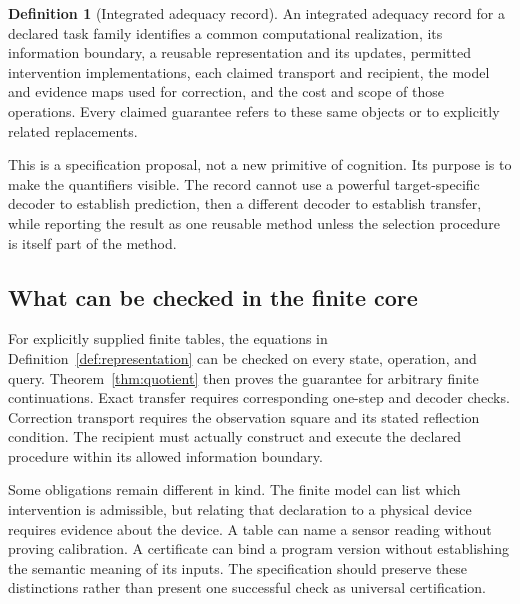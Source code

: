 \documentclass[11pt,letterpaper]{article}
\theoremstyle{plain}
\theoremstyle{definition}
\newtheorem{definition}[theorem]{Definition}
\begin{document}
\begin{definition}[Integrated adequacy record]\label{def:witness}
An integrated adequacy record for a declared task family identifies a common computational realization, its information boundary, a reusable representation and its updates, permitted intervention implementations, each claimed transport and recipient, the model and evidence maps used for correction, and the cost and scope of those operations. Every claimed guarantee refers to these same objects or to explicitly related replacements.
\end{definition}
This is a specification proposal, not a new primitive of cognition. Its purpose is to make the quantifiers visible. The record cannot use a powerful target-specific decoder to establish prediction, then a different decoder to establish transfer, while reporting the result as one reusable method unless the selection procedure is itself part of the method.

\subsection{What can be checked in the finite core}
For explicitly supplied finite tables, the equations in Definition~\ref{def:representation} can be checked on every state, operation, and query. Theorem~\ref{thm:quotient} then proves the guarantee for arbitrary finite continuations. Exact transfer requires corresponding one-step and decoder checks. Correction transport requires the observation square and its stated reflection condition. The recipient must actually construct and execute the declared procedure within its allowed information boundary.

Some obligations remain different in kind. The finite model can list which intervention is admissible, but relating that declaration to a physical device requires evidence about the device. A table can name a sensor reading without proving calibration. A certificate can bind a program version without establishing the semantic meaning of its inputs. The specification should preserve these distinctions rather than present one successful check as universal certification.
\end{document}
